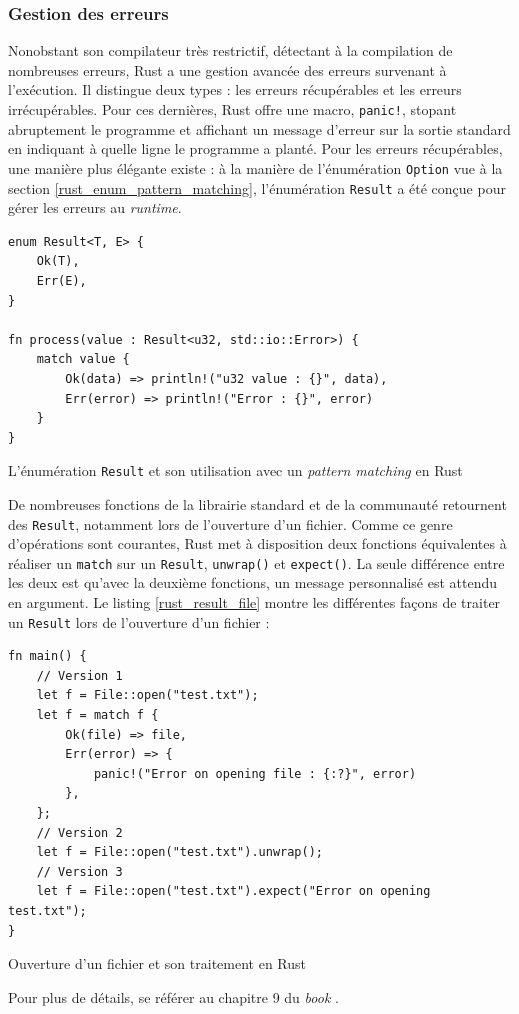 \documentclass[a4paper, 12pt]{article}
\newenvironment{code}{\captionsetup{type=listing}}{}
\begin{document}
\subsubsection{Gestion des erreurs}
Nonobstant son compilateur très restrictif, détectant à la compilation de nombreuses erreurs, Rust 
a une gestion avancée des erreurs survenant à l'exécution. Il distingue deux types : les erreurs 
récupérables et les erreurs irrécupérables. Pour ces dernières, Rust offre une macro, 
\texttt{panic!}, stopant abruptement le programme et affichant un message d'erreur sur 
la sortie standard en indiquant à quelle ligne le programme a planté. Pour les erreurs récupérables, 
une manière plus élégante existe : à la manière de l'énumération \texttt{Option} vue à 
la section \ref{rust_enum_pattern_matching}, l'énumération \texttt{Result} a été conçue 
pour gérer les erreurs au \textit{runtime}.
\bigbreak
\begin{code}
    \begin{verbatim}
enum Result<T, E> {
    Ok(T),
    Err(E),
}

fn process(value : Result<u32, std::io::Error>) {
    match value {
        Ok(data) => println!("u32 value : {}", data),
        Err(error) => println!("Error : {}", error)
    }
}
    \end{verbatim}
    \caption{L'énumération \texttt{Result} et son utilisation avec un \textit{pattern matching} en Rust}
    \label{rust_result}
\end{code}
\bigbreak
De nombreuses fonctions de la librairie standard et de la communauté retournent des 
\texttt{Result}, notamment lors de l'ouverture d'un fichier. Comme ce genre d'opérations 
sont courantes, Rust met à disposition deux fonctions équivalentes à réaliser un \texttt{match} 
sur un \texttt{Result}, \texttt{unwrap()} et \texttt{expect()}. La 
seule différence entre les deux est qu'avec la deuxième fonctions, un message personnalisé est 
attendu en argument. Le listing \ref{rust_result_file} montre les différentes façons de traiter un 
\texttt{Result} lors de l'ouverture d'un fichier :
\bigbreak
\begin{code}
    \begin{verbatim}
fn main() {
    // Version 1
    let f = File::open("test.txt");
    let f = match f {
        Ok(file) => file,
        Err(error) => {
            panic!("Error on opening file : {:?}", error)
        },
    };
    // Version 2
    let f = File::open("test.txt").unwrap();
    // Version 3
    let f = File::open("test.txt").expect("Error on opening test.txt");
}
    \end{verbatim}
    \caption{Ouverture d'un fichier et son traitement en Rust}
    \label{rust_result_file}
\end{code}
\bigbreak
Pour plus de détails, se référer au chapitre 9 du \textit{book} \cite{ref0}.
\end{document}
